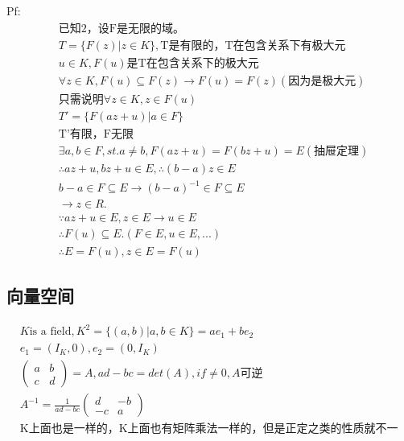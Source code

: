 \documentclass[12pt, a4paper]{article}  %
\begin{document}
Pf:
\begin{align}
    &\text{已知2，设F是无限的域。}\\
    &T=\{F(z)|z\in K\},\text{T是有限的，T在包含关系下有极大元}\\
    &u\in K,F(u)\text{是T在包含关系下的极大元}\\
    &\forall z\in K,F(u)\subseteq F(z)\rightarrow F(u)=F(z)(\text{因为是极大元})\\
    &\text{只需说明}\forall z\in K,z\in F(u)\\
    &T'=\{F(az+u)|a\in F\}\\
    &\text{T'有限，F无限}\\
    &\exists a,b\in F,st.a\neq b,F(az+u)=F(bz+u)=E(\text{抽屉定理})\\
    &\therefore az+u,bz+u\in E,\therefore (b-a)z\in E\\
    &b-a\in F\subseteq E\rightarrow (b-a)^{-1}\in F\subseteq E\\
    &\rightarrow z\in R.\\
    &\because az+u\in E,z\in E\rightarrow u\in E\\
    &\therefore F(u)\subseteq E.(F\in E,u\in E,...)\\
    &\therefore E=F(u),z\in E=F(u)
\end{align}

\subsection{向量空间}
\begin{align}
    &K\text{is a field},K^2=\{(a,b)|a,b\in K\}=ae_1+be_2\\
    &e_1=(I_K,0),e_2=(0,I_K)\\
    &\begin{pmatrix}
        a & b\\
        c & d
    \end{pmatrix}=A,ad-bc=det(A),if\neq 0,A\text{可逆}\\
    &A^{-1}=\frac{1}{ad-bc}
    \begin{pmatrix}
        d & -b\\
        -c & a
    \end{pmatrix}\\
    &\text{K上面也是一样的，K上面也有矩阵乘法一样的，但是正定之类的性质就不一定有了}
\end{align}
\end{document}
